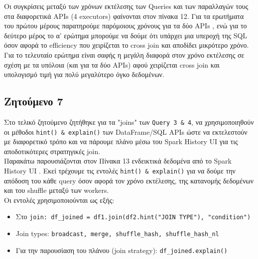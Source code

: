 \documentclass{article}
\begin{document}
Οι συγκρίσεις μεταξύ των χρόνων εκτέλεσης των Queries  και των παραλλαγών τους στα διαφορετικά APIs (4 executors) φαίνονται στον πίνακα 12. Για τα ερωτήματα του πρώτου μέρους παρατηρούμε παρόμοιους χρόνους για τα δύο  APIs , ενώ για το δεύτερο μέρος το α' ερώτημα μπορούμε να δούμε ότι υπάρχει μια υπεροχή της  SQL όσον αφορά το  efficiency που χειρίζεται το  cross join  και αποδίδει μικρότερο χρόνο. Για το τελευταίο ερώτημα είναι σαφής η μεγάλη διαφορά στον χρόνο εκτέλεσης σε σχέση με τα υπόλοια (και για τα δύο  APIs)  αφού χειρίζεται  cross join και υπολογισμό τιμή για πολύ μεγαλύτερο όγκο δεδομένων. 


\subsection*{Ζητούμενο 7}
\label{subsec:Z7}


Στο τελικό ζητούμενο ζητήθηκε για τα  "joins"  των  \texttt{Query 3 \& 4},
 να χρησιμοποιηθούν οι μέθοδοι \texttt{hint() \& explain()}  των  DataFrame/SQL APIs ώστε να εκτελεστούν με διαφορετικό τρόπο και να πάρουμε πλάνο μέσω του  Spark History UI  για τις αποδοτικότερες στρατηγικές  join.\\ 






Παρακάτω παρουσιάζονται στον Πίνακα 13 ενδεικτικά δεδομένα από το  Spark History UI . Εκεί τρέχουμε τις εντολές \texttt{hint() \& explain()}  για να δούμε την απόδοση του κάθε  query  όσον αφορά τον χρόνο εκτέλεσης, της κατανομής δεδομένων και του  shuffle  μεταξύ των  workers.\\
Οι εντολές χρησιμοποιούνται ως εξής: 
\begin{itemize}
    \item   Στο  \texttt{join: df\_joined = df1.join(df2.hint("JOIN TYPE"), "condition")}
    \item   Join types: \texttt{broadcast, merge, shuffle\_hash, shuffle\_hash\_nl}
    
    \item   {}Για την παρουσίαση του πλάνου (join strategy): \texttt{df\_joined.explain()}
\end{itemize}
\end{document}
